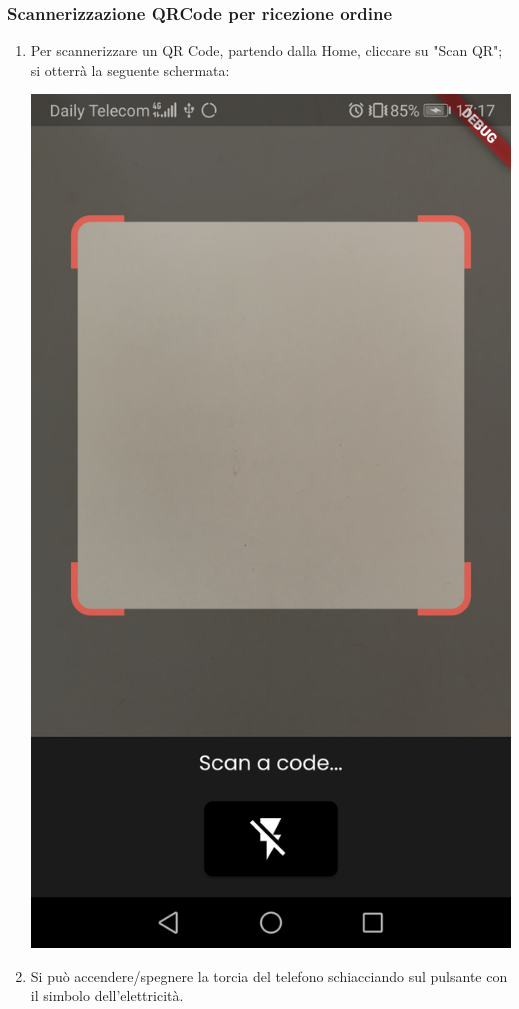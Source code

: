 \subsubsection{Scannerizzazione QRCode per ricezione ordine}
\begin{enumerate}
        \item Per scannerizzare un QR Code, partendo dalla Home, cliccare su "Scan QR"; si otterrà la seguente schermata: 
     \begin{center}
        \includegraphics[scale = 0.1]{img/scanMobile.jpg}
    \end{center}
    \item Si può accendere/spegnere la torcia del telefono schiacciando sul pulsante con il simbolo dell'elettricità.
\end{enumerate}

